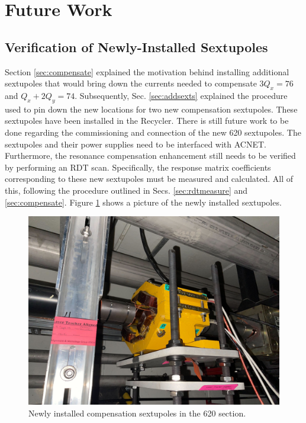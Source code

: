 \section{Future Work}

\subsection{Verification of Newly-Installed Sextupoles}

Section \ref{sec:compensate} explained the motivation behind installing additional sextupoles that would bring down the currents needed to compensate $3Q_x=76$ and $Q_x+ 2Q_y = 74$. Subsequently, Sec. \ref{sec:addsexts} explained the procedure used to pin down the new locations for two new compensation sextupoles. These sextupoles have been installed in the Recycler. There is still future work to be done regarding the commissioning and connection of the new 620 sextupoles. The sextupoles and their power supplies need to be interfaced with ACNET. Furthermore, the resonance compensation enhancement still needs to be verified by performing an RDT scan. Specifically, the response matrix coefficients corresponding to these new sextupoles must be measured and calculated. All of this, following the procedure outlined in Secs. \ref{sec:rdtmeasure} and \ref{sec:compensate}. Figure \ref{fig:new620sexts} shows a picture of the newly installed sextupoles.

\begin{figure}[H]
    \centering
    \includegraphics[width=\columnwidth]{chapter7/620_sext.jpg}
    \caption{Newly installed compensation sextupoles in the 620 section.}
    \label{fig:new620sexts}
\end{figure}

